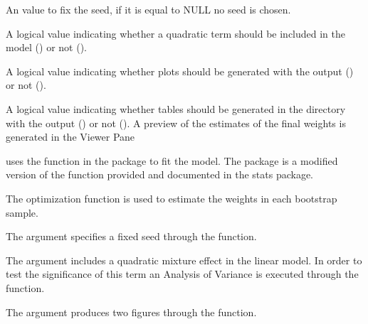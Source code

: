 \documentclass[a4paper]{book}
\begin{document}
\begin{Arguments}
\begin{ldescription}
\item[\code{seed}] An  value to fix the seed, if it is equal to NULL no seed is chosen.

\item[\code{wqs2}] A logical value indicating whether a quadratic term should be included in the model
() or not ().

\item[\code{plots}] A logical value indicating whether plots should be generated with the output
() or not ().

\item[\code{tables}] A logical value indicating whether tables should be generated in the directory
with the output () or not (). A preview of the estimates
of the final weights is generated in the Viewer Pane
\end{ldescription}
\end{Arguments}
%
\begin{Details}\relax
{} uses the  function in the  package to fit the model. The
 package is a modified version of the  function provided and
documented in the stats package.\\{}

The  optimization function is used to estimate the weights in each
bootstrap sample.

The  argument  specifies a fixed seed through the  function.\\{}

The  argument includes a quadratic mixture effect in the linear model. In order to test
the significance of this term an Analysis of Variance is executed through the
 function.\\{}

The  argument produces two figures through the  function.\\{}
\end{Details}
%
\end{document}
